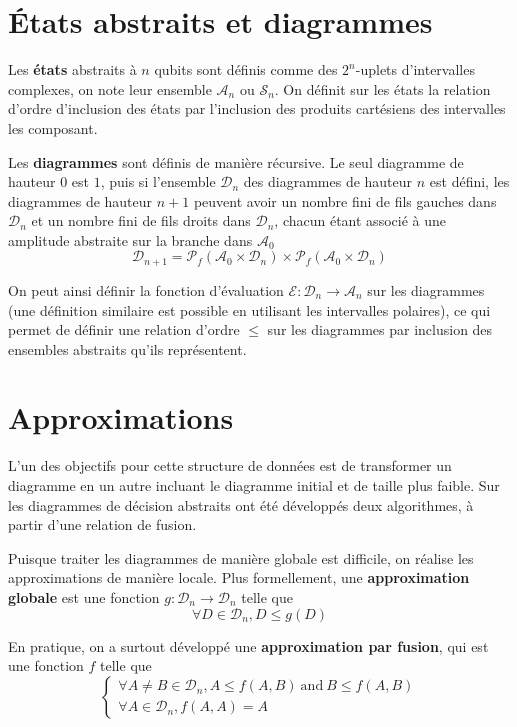 \section{États abstraits et diagrammes}

Les \textbf{états} abstraits à $n$ qubits sont définis comme des $2^n$-uplets d'intervalles complexes, on note leur ensemble $\mathcal A_n$ ou $\mathcal S_n$. On définit sur les états la relation d'ordre d'inclusion des états par l'inclusion des produits cartésiens des intervalles les composant.

Les \textbf{diagrammes} sont définis de manière récursive. Le seul diagramme de hauteur 0 est $\boxed 1$, puis si l'ensemble $\mathcal D_n$ des diagrammes de hauteur $n$ est défini, les diagrammes de hauteur $n+1$ peuvent avoir un nombre fini de fils gauches dans $\mathcal D_n$ et un nombre fini de fils droits dans $\mathcal D_n$, chacun étant associé à une amplitude abstraite sur la branche dans $\mathcal A_0$
$$\mathcal{D}_{n+1} = \mathscr{P}_f(\mathcal{A}_0 \times \mathcal{D}_n) \times \mathscr{P}_f(\mathcal{A}_0 \times \mathcal{D}_n)$$

On peut ainsi définir la fonction d'évaluation $\mathcal E : \mathcal D_n \to \mathcal A_n$ sur les diagrammes (une définition similaire est possible en utilisant les intervalles polaires), ce qui permet de définir une relation d'ordre $\le$ sur les diagrammes par inclusion des ensembles abstraits qu'ils représentent.

\section{Approximations}

L'un des objectifs pour cette structure de données est de transformer un diagramme en un autre incluant le diagramme initial et de taille plus faible. Sur les diagrammes de décision abstraits ont été développés deux algorithmes, à partir d'une relation de fusion.

Puisque traiter les diagrammes de manière globale est difficile, on réalise les approximations de manière locale. Plus formellement, une \textbf{approximation globale} est une fonction $g : \mathcal D_n \to \mathcal D_n$ telle que
$$\forall D \in \mathcal D_n, D \le g(D)$$

En pratique, on a surtout développé une \textbf{approximation par fusion}, qui est une fonction $f$ telle que
$$\begin{cases}
  \forall A \not= B \in \mathcal{D}_n, A \le f(A, B)~\text{and}~B \le f(A, B) \\
  \forall A \in \mathcal{D}_n, f(A, A) = A
\end{cases}
$$

